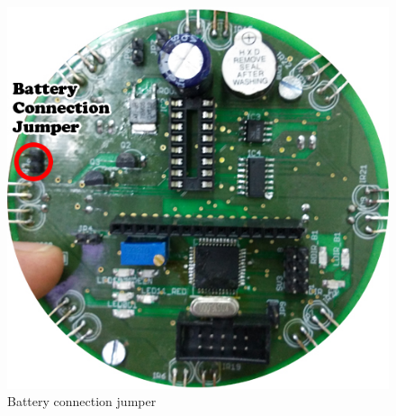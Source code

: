\documentclass[a4paper,12pt,oneside]{book}
\begin{document}
	\hfill\\
	\begin{figure}[h!]
		\caption{Battery connection jumper}
		\includegraphics[width=\textwidth]{./HardwareManual/BatteryIndication.jpg}
	\end{figure}
	\hfill\\	
	
\end{document}
